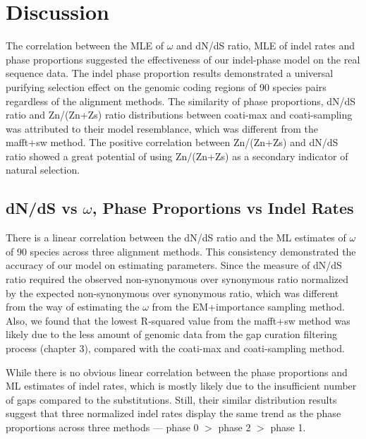 \newpage

\section{Discussion}
The correlation between the MLE of $\omega$ and dN/dS ratio, MLE of indel rates and phase proportions suggested the effectiveness of our indel-phase model on the real sequence data. The indel phase proportion results demonstrated a universal purifying selection effect on the genomic coding regions of 90 species pairs regardless of the alignment methods. The similarity of phase proportions, dN/dS ratio and Zn/(Zn+Zs) ratio distributions between coati-max and coati-sampling was attributed to their model resemblance, which was different from the mafft+sw method. The positive correlation between Zn/(Zn+Zs) and dN/dS ratio showed a great potential of using Zn/(Zn+Zs) as a secondary indicator of natural selection. 

\subsection{dN/dS vs $\omega$, Phase Proportions vs Indel Rates}
There is a linear correlation between the dN/dS ratio and the ML estimates of $\omega$ of 90 species across three alignment methods. This consistency demonstrated the accuracy of our model on estimating parameters. Since the measure of dN/dS ratio required the observed non-synonymous over synonymous ratio normalized by the expected non-synonymous over synonymous ratio, which was different from the way of estimating the $\omega$ from the EM+importance sampling method. Also, we found that the lowest R-squared value from the mafft+sw method was likely due to the less amount of genomic data from the gap curation filtering process (chapter 3), compared with the coati-max and coati-sampling method. 

While there is no obvious linear correlation between the phase proportions and ML estimates of indel rates, which is mostly likely due to the insufficient number of gaps compared to the substitutions. Still, their similar distribution results suggest that three normalized indel rates display the same trend as the phase proportions across three methods --- phase 0 $>$ phase 2 $>$ phase 1.    

